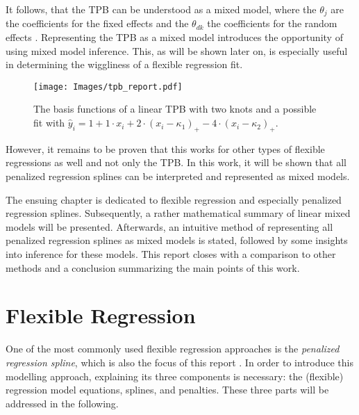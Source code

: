 \documentclass[12pt]{article}
\begin{document}
It follows, that the TPB can be understood as a mixed model, where the $\theta_j$ are the coefficients for the fixed effects and the $\theta_{dk}$ the coefficients for the random effects \cite{ruppert2003semiparametric}. Representing the TPB as a mixed model introduces the opportunity of using mixed model inference. This, as will be shown later on, is especially useful in determining the wiggliness of a flexible regression fit.

\begin{figure}
\begin{center}
\vspace{2em}
\texttt{[image: Images/tpb\_report.pdf]}
\end{center}
\vspace{-2em}
\caption[caption]{The basis functions of a linear TPB with two knots and a possible fit with $\hat{y}_i = 1 + 1 \cdot x_i +  2 \cdot(x_i{-}\kappa_1)_+ - 4\cdot (x_i{-}\kappa_2)_+.$}\label{tpb}
\vspace{1em}
\end{figure}

However, it remains to be proven that this works for other types of flexible regressions as well and not only the TPB. 
In this work, it will be shown that all penalized regression splines can be interpreted and represented as mixed models. 

The ensuing chapter is dedicated to flexible regression and especially penalized regression splines. Subsequently, a rather mathematical summary of linear mixed models will be presented. Afterwards, an intuitive method of representing all penalized regression splines as mixed models is stated, followed by some insights into inference for these models. This report closes with a comparison to other methods and a conclusion summarizing the main points of this work.


\section{Flexible Regression}

One of the most commonly used flexible regression approaches is the \textit{penalized regression spline}, which is also the focus of this report \cite{fahrmeir2013regression, ruppert2003semiparametric, wood2017generalized}. In order to introduce this modelling approach, explaining its three components is necessary: the (flexible) regression model equations, splines, and penalties. These three parts will be addressed in the following.
\end{document}
